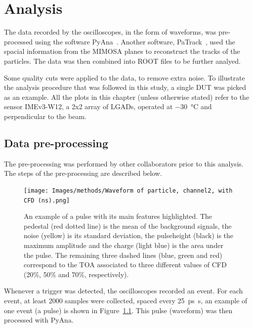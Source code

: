 \chapter{Analysis}\label{chap:methods}

The data recorded by the oscilloscopes, in the form of waveforms, was pre-processed using the software PyAna~\cite{atlas_hgtd_pyana_2025}. Another software, PaTrack~\cite{atlas_hgtd_patrack_2025}, used the spacial information from the MIMOSA planes to reconstruct the tracks of the particles. The data was then combined into ROOT files to be further analyed.


Some quality cuts were applied to the data, to remove extra noise. To illustrate the analysis procedure that was followed in this study, a single DUT was picked as an example. All the plots in this chapter (unless otherwise stated) refer to the sensor IMEv3-W12, a 2x2 array of LGADs, operated at \qty{-30}{\degreeCelsius} and perpendicular to the beam.

\section{Data pre-processing}

The pre-processing was performed by other collaborators prior to this analysis. The steps of the pre-processing are described below.

\begin{figure}[!hb]
    \centering
    \texttt{[image: Images/methods/Waveform of particle, channel2, with CFD (ns).png]}
    \captionsetup{width=\captionwidth}
    \caption{An example of a pulse with its main features highlighted. The pedestal (red dotted line) is the mean of the background signals, the noise (yellow) is its standard deviation, the pulseheight (black) is the maximum amplitude and the charge (light blue) is the area under the pulse. The remaining three dashed lines (blue, green and red) correspond to the TOA associated to three different values of CFD (20\%, 50\% and 70\%, respectively).}
    \label{fig:waveform_features}
\end{figure} 

Whenever a trigger was detected, the oscilloscopes recorded an event. For each event, at least 2000 samples were collected, spaced every \qty{25}{\ps\second}, an example of one event (a pulse) is shown in Figure~\ref{fig:waveform_features}. This pulse (waveform) was then processed with PyAna.

